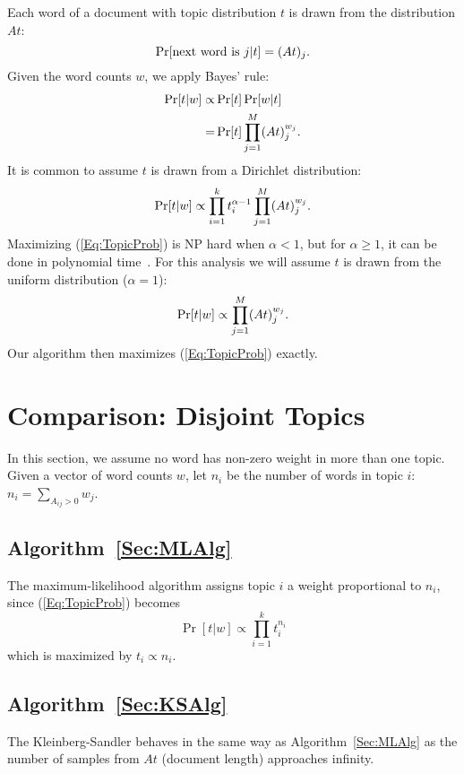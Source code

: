 \documentclass{article}
\begin{document}
Each word of a document with topic distribution \(t\) is drawn from the distribution \(A t\):
\[ \Pr[\text{next word is \(j\)} | t] = (A t)_j \ldotp \]
Given the word counts \(w\), we apply Bayes' rule:
\begin{align*}
    \Pr[t | w] \propto & \Pr[t] \Pr[w | t]
\\  = & \Pr[t] \prod_{j=1}^M (A t)_j^{w_j} \ldotp
\end{align*}
It is common to assume \(t\) is drawn from a Dirichlet distribution:
\begin{equation}
    \label{Eq:TopicProbWithAlpha}
    \Pr[t | w] \propto \prod_{i = 1}^k t_i^{\alpha - 1} \prod_{j=1}^M (A t)_j^{w_j} \ldotp
\end{equation}
Maximizing (\ref{Eq:TopicProb}) is NP hard when \(\alpha < 1\), but for \(\alpha \ge 1\), it can be done in polynomial time~\cite{conf/nips/SontagR11}.
For this analysis we will assume \(t\) is drawn from the uniform distribution (\(\alpha=1\)):
\begin{equation}
    \label{Eq:TopicProb}
    \Pr[t | w] \propto \prod_{j=1}^M (A t)_j^{w_j} \ldotp
\end{equation}
Our algorithm then maximizes (\ref{Eq:TopicProb}) exactly.

\section{Comparison: Disjoint Topics}

In this section, we assume no word has non-zero weight in more than one topic.
Given a vector of word counts \(w\), let \(n_i\) be the number of words in topic \(i\): \(n_i = \sum_{A_{ij} > 0} w_j\).

\subsection{Algorithm~\ref{Sec:MLAlg}}

The maximum-likelihood algorithm assigns topic \(i\) a weight proportional to \(n_i\), since (\ref{Eq:TopicProb}) becomes
\[ \Pr[t | w] \propto \prod_{i=1}^k t_i^{n_i} \]
which is maximized by \(t_i \propto n_i\).

\subsection{Algorithm~\ref{Sec:KSAlg}}

The Kleinberg-Sandler behaves in the same way as Algorithm~\ref{Sec:MLAlg} as the number of samples from \(A t\)  (document length) approaches infinity.
\end{document}

